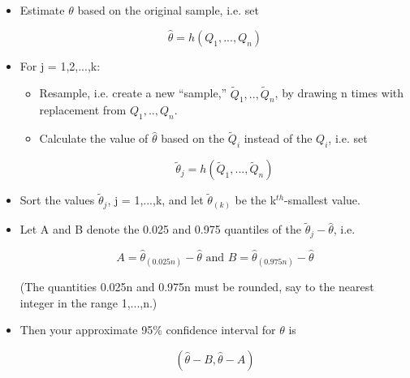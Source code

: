 \begin{itemize}

\item Estimate $\theta$ based on the original sample, i.e. set

\begin{equation}
\widehat{\theta} = h(Q_1,...,Q_n)
\end{equation}

\item For j = 1,2,...,k:

   \begin{itemize}

   \item Resample, i.e. create a new ``sample,'' $\widetilde{Q}_1,..,
   \widetilde{Q}_n$, by drawing n times with replacement from
   $Q_1,..,Q_n$.

   \item Calculate the value of $\widehat{\theta}$ based on the
   $\widetilde{Q}_i$ instead of the $Q_i$, i.e. set

   \begin{equation}
   \widetilde{\theta}_j = h(\widetilde{Q}_1,...,\widetilde{Q}_n)
   \end{equation}

   \end{itemize}

\item Sort the values $\widetilde{\theta}_j$, j = 1,...,k, and let
$\widetilde{\theta}_{(k)}$ be the k$^{th}$-smallest value.

\item Let A and B denote the 0.025 and 0.975 quantiles of the
$\widetilde{\theta}_j - \widehat{\theta}$, i.e. 

\begin{equation}
\label{abci}
A = \widehat{\theta}_{(0.025n)} - \widehat{\theta} \textrm{ and }
B = \widehat{\theta}_{(0.975n)} - \widehat{\theta}
\end{equation}

(The quantities 0.025n and 0.975n must be rounded, say to the nearest
integer in the range 1,...,n.) 

\item Then your approximate 95\% confidence interval for $\theta$ is 

\begin{equation}
\label{bootci}
(\widehat{\theta} - B, \widehat{\theta} - A)
\end{equation}

\end{itemize}

